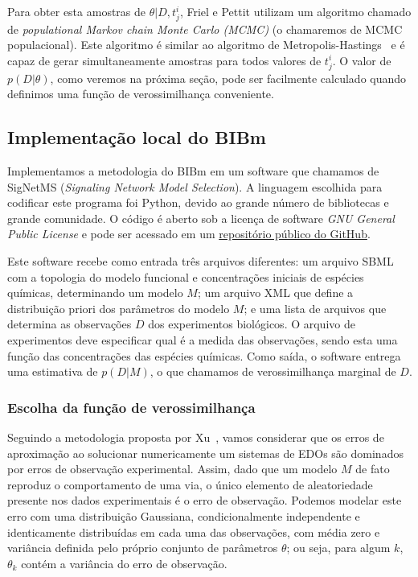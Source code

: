 \documentclass[12pt]{article}
\begin{document}
Para obter esta amostras de $\theta | D, t^i_j$, Friel e Pettit utilizam 
um algoritmo chamado de {\em populational Markov chain Monte Carlo (MCMC)} 
(o chamaremos de MCMC populacional). Este algoritmo é similar ao
algoritmo de Metropolis-Hastings~\cite{BayesianDataAnalysis} e é capaz
de gerar simultaneamente amostras para todos valores de $t^i_j$. O valor
de $p (D | \theta)$, como veremos na próxima seção, pode ser facilmente
calculado quando definimos uma função de verossimilhança conveniente.

\subsection{Implementação local do BIBm}\label{bibm_implementation}
Implementamos a metodologia do BIBm em um software que chamamos de 
SigNetMS ({\em Signaling Network Model Selection}). A linguagem 
escolhida para codificar este programa foi Python, devido ao grande 
número de bibliotecas e grande comunidade. O código é aberto sob a 
licença de software {\em GNU General Public License} e pode ser acessado 
em um \href{https://github.com/gustavoem/SigNetMS}{repositório público 
do GitHub}.

Este software recebe como entrada três arquivos diferentes: um arquivo 
SBML~\cite{hucka2003systems} com a topologia do modelo funcional e 
concentrações iniciais de espécies químicas, determinando um modelo $M$; 
um arquivo XML que define a distribuição priori dos parâmetros do modelo 
$M$; e uma lista de arquivos que determina as observações $D$ dos 
experimentos biológicos. O arquivo de experimentos deve especificar qual 
é a medida das observações, sendo esta uma função das concentrações das 
espécies químicas. Como saída, o software entrega uma estimativa de 
$p (D | M)$, o que chamamos de verossimilhança marginal de $D$.

\subsubsection{Escolha da função de verossimilhança}
Seguindo a metodologia proposta por Xu~\cite{Xu2010}, vamos considerar
que os erros de aproximação ao solucionar numericamente um sistemas de
EDOs são dominados por erros de observação experimental. Assim, dado que
um modelo $M$ de fato reproduz o comportamento de uma via, o único 
elemento de aleatoriedade presente nos dados experimentais é o erro de 
observação. Podemos modelar este erro com uma distribuição Gaussiana,
condicionalmente independente e identicamente distribuídas em cada uma 
das observações, com média zero e variância definida pelo próprio 
conjunto de parâmetros $\theta$; ou seja, para algum $k$, 
$\theta_{k}$ contém a variância do erro de observação. 
\end{document}
